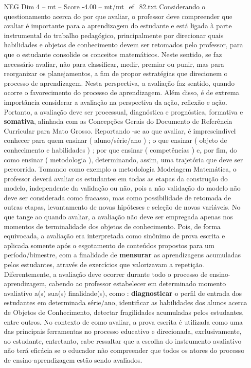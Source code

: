\begin{textsample}{NEG Dim 4 – mt – Score -4.00 – mt/mt\_ef\_82.txt}
Considerando o questionamento acerca do por que avaliar, o professor deve compreender que avaliar é importante para a aprendizagem do estudante e está ligada à parte instrumental do trabalho pedagógico, principalmente por direcionar quais habilidades e objetos de conhecimento devem ser retomados pelo professor, para que o estudante consolide os conceitos matemáticos.
Neste sentido, se faz necessário avaliar, não para classificar, medir, premiar ou punir, mas para reorganizar os planejamentos, a fim de propor estratégias que direcionem o processo de aprendizagem.
Nesta perspectiva, a avaliação faz sentido, quando ocorre o favorecimento do processo de aprendizagem.
Além disso, é de extrema importância considerar a avaliação na perspectiva da ação, reflexão e ação.
Portanto, a avaliação deve ser processual, diagnóstica e prognóstica, formativa e \textbf{somativa}, alinhada com as Concepções Gerais do Documento de Referência Curricular para Mato Grosso.
Reportando -se ao que avaliar, é imprescindível conhecer para quem ensinar ( aluno/série/ano ) ; o que ensinar ( objeto de conhecimento e habilidades ) ; por que ensinar ( competências ) e, por fim, do como ensinar ( metodologia ), determinando, assim, uma trajetória que deve ser percorrida.
Tomando como exemplo a metodologia Modelagem Matemática, o professor deverá avaliar os estudantes em todas as etapas da construção do modelo, independente da validação ou não, pois a não validação do modelo não deve ser considerada como fracasso, mas como possibilidade de retomada de outras etapas, levantamento de novas hipóteses e seleção de novas variáveis.
No que tange ao quando avaliar, a avaliação não deve ser empregada apenas nos momentos de terminalidade dos objetos de conhecimento.
Pois, de forma equivocada, a avaliação era interpretada como sinônimo de prova escrita e aplicada somente após o esgotamento de conteúdos propostos para um período/bimestre, com a finalidade de \textbf{mensurar} as aprendizagens acumuladas pelos estudantes, através de exercícios que valorizavam a repetição.
Diferentemente, a avaliação deve ocorrer durante todo o processo de ensino-aprendizagem, cabendo ao professor estabelecer em determinado momento avaliativo a(s) sua(s) finalidade(s), como : \textbf{diagnosticar} o perfil de entrada dos estudantes em determinada série/ano, identificar as habilidades dos alunos acerca de Objetos de Conhecimento, detectar fragilidades acumuladas pelos estudantes, entre outros.
No contexto de como avaliar, a prova escrita é utilizada como uma das principais ferramentas no processo educativo e direcionada, exclusivamente, ao estudante, entretanto, cabe ressaltar que a escolha do instrumento avaliativo não terá eficácia se o educador não compreender que todos os atores do processo de ensino-aprendizagem estão sendo avaliados.

\end{textsample}
